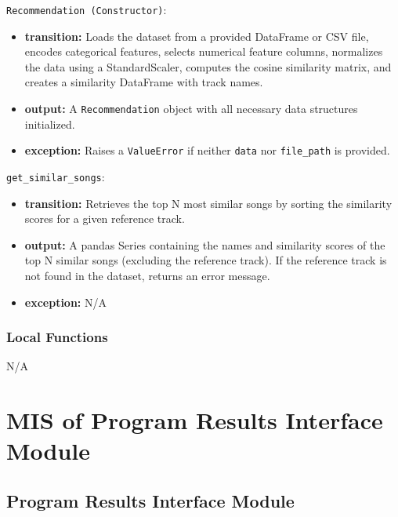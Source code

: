 \documentclass[12pt, titlepage]{article}
\begin{document}
{\noindent \texttt{Recommendation (Constructor)}:
\begin{itemize}
    \item \textbf{transition:} Loads the dataset from a provided DataFrame or CSV file, encodes categorical features, selects numerical feature columns, normalizes the data using a StandardScaler, computes the cosine similarity matrix, and creates a similarity DataFrame with track names.
    \item \textbf{output:} A \texttt{Recommendation} object with all necessary data structures initialized.
    \item \textbf{exception:} Raises a \texttt{ValueError} if neither \texttt{data} nor \texttt{file\_path} is provided.
\end{itemize}

\noindent \texttt{get\_similar\_songs}:
\begin{itemize}
    \item \textbf{transition:} Retrieves the top N most similar songs by sorting the similarity scores for a given reference track.
    \item \textbf{output:} A pandas Series containing the names and similarity scores of the top N similar songs (excluding the reference track). If the reference track is not found in the dataset, returns an error message.
    \item \textbf{exception:} N/A
\end{itemize}

\subsubsection{Local Functions}
N/A
}

\section{MIS of Program Results Interface Module} 

\subsection{Program Results Interface Module}
\end{document}
